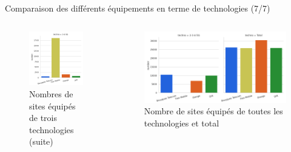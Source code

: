 \begin{frame}{Comparaison des différents équipements en terme de technologies (7/7)}
    \begin{columns}
        \begin{column}{0.35\textwidth}
            \begin{figure}
                \includegraphics[height=0.4\paperheight]{images/barplots/3-4-5G.png}
                \caption{\label{fig:3-4-5G}Nombres de sites équipés de trois technologies (suite)}
            \end{figure}
        \end{column}
            
        \begin{column}{0.65\textwidth}
            \begin{figure}
                \includegraphics[height=0.4\paperheight]{images/barplots/all-tot.png}
                \caption{\label{fig:all-tot}Nombre de sites équipés de toutes les technologies et total}
            \end{figure}
        \end{column}
    \end{columns} 
\end{frame}

